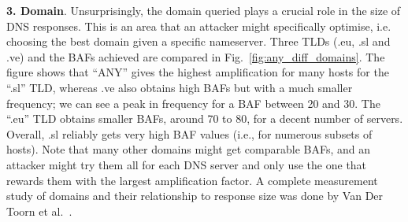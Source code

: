  \noindent \textbf{3. Domain}. Unsurprisingly, the domain queried plays a crucial role in the size of DNS responses. This is an area that an attacker might specifically optimise, i.e. choosing the best domain given a specific nameserver. Three TLDs (.eu, .sl and .ve) and the BAFs achieved are compared in Fig.~\ref{fig:any_diff_domains}. The figure shows that ``ANY'' gives the highest amplification for many hosts for the ``.sl'' TLD, whereas .ve also obtains high BAFs but with a much smaller frequency; we can see a peak in frequency for a BAF between 20 and 30. The ``.eu'' TLD obtains smaller BAFs, around 70 to 80, for a decent number of servers. Overall, .sl reliably gets very high BAF values (i.e., for numerous subsets of hosts). Note that many other domains might get comparable BAFs, and an attacker might try them all for each DNS server and only use the one that rewards them with the largest amplification factor. A complete measurement study of domains and their relationship to response size was done by Van Der Toorn et al.~\cite{van_der_toorn_anyway_2021}.

